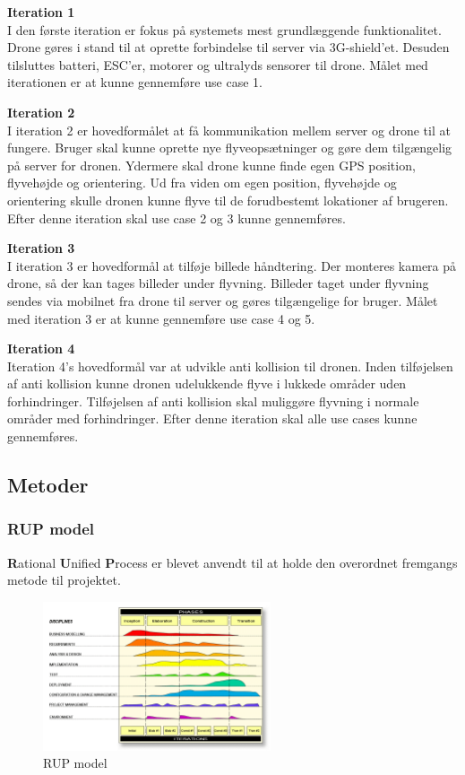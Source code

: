 \textbf{Iteration 1}\\
I den første iteration er fokus på systemets mest grundlæggende funktionalitet. 
Drone gøres i stand til at oprette forbindelse til server via 3G-shield'et.
Desuden tilsluttes batteri, ESC'er, motorer og ultralyds sensorer til drone. 
Målet med iterationen er at kunne gennemføre use case 1. 

\textbf{Iteration 2}\\
I iteration 2 er hovedformålet at få kommunikation mellem server og drone til at fungere. Bruger skal kunne oprette nye flyveopsætninger og gøre dem tilgængelig på server for dronen. Ydermere skal drone kunne finde egen GPS position, flyvehøjde og orientering. Ud fra viden om egen position, flyvehøjde og orientering skulle dronen kunne flyve til de forudbestemt lokationer af brugeren. Efter denne iteration skal use case 2 og 3 kunne gennemføres.

\textbf{Iteration 3}\\
I iteration 3 er hovedformål at tilføje billede håndtering. Der monteres kamera på drone, så der kan tages billeder under flyvning. Billeder taget under flyvning sendes via mobilnet fra drone til server og gøres tilgængelige for bruger. Målet med iteration 3 er at kunne gennemføre use case 4 og 5.

\textbf{Iteration 4}\\
Iteration 4's hovedformål var at udvikle anti kollision til dronen. Inden tilføjelsen af anti kollision kunne dronen udelukkende flyve i lukkede områder uden forhindringer. Tilføjelsen af anti kollision skal muliggøre flyvning i normale områder med forhindringer. Efter denne iteration skal alle use cases kunne gennemføres.

\newpage
\subsection{Metoder}

\subsubsection{RUP model}
\textbf{R}ational \textbf{U}nified \textbf{P}rocess er blevet anvendt til at holde den overordnet fremgangs metode til projektet.  

\begin{figure}[H]
	\centering
	\includegraphics[width=0.60\textwidth]{Billeder/Udviklingsproces/RUP}
	\caption{RUP model}
	\label{fig:rup}
\end{figure}

